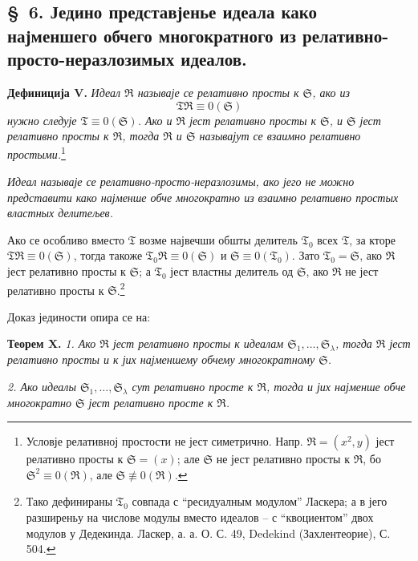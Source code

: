﻿\documentclass[11pt]{article}
\newcommand{\ideal}[1]{\mathfrak{#1}}
\begin{document}

\setcounter{footnote}{22}
\subsection*{\S~6. Једино представјенье идеала како најменшего обчего многократного из релативно-просто-неразлозимых идеалов.}

\textbf{Дефиниција V.} \emph{Идеал \(\ideal R\) называје се релативно просты к \(\ideal S\), ако из
\[
 \ideal T\ideal R\equiv0(\ideal S)
\]
нужно следује \(\ideal T\equiv0(\ideal S)\). Ако и \(\ideal R\) јест релативно просты к \(\ideal S\), и \(\ideal S\) јест релативно просты к \(\ideal R\), тогда \(\ideal R\) и \(\ideal S\) называјут се взаимно релативно простыми.}\footnote{Условје релативној простости не јест симетрично. Напр. \(\ideal R=(x^2,y)\) јест релативно просты к \(\ideal S=(x)\); але \(\ideal S\) не јест релативно просты к \(\ideal R\), бо \(\ideal S^2\equiv0(\ideal R)\), але \(\ideal S\not\equiv0(\ideal R)\).}

\emph{Идеал называје се релативно-просто-неразлозимы, ако јего не можно представити како најменше обче многократно из взаимно релативно простых властных делитељев.}

Ако се особливо вместо \(\ideal T\) возме највечши обшты делитель \(\ideal T_0\) всех \(\ideal T\), за кторе \(\ideal T\ideal R\equiv0(\ideal S)\), тогда такоже \(\ideal T_0\ideal R\equiv0(\ideal S)\) и \(\ideal S\equiv0(\ideal T_0)\). Зато \(\ideal T_0=\ideal S\), ако \(\ideal R\) јест релативно просты к \(\ideal S\); а \(\ideal T_0\) јест властны делитель од \(\ideal S\), ако \(\ideal R\) не јест релативно просты к \(\ideal S\).\footnote{Тако дефинираны \(\ideal T_0\) совпада с ``ресидуалным модулом'' Ласкера; а в јего разширеньу на числове модулы вместо идеалов -- с ``квоциентом'' двох модулов у Дедекинда. Ласкер, а. а. О. С. 49, Dedekind (Захлентеорие), С. 504.}

Доказ јединости опира се на:

\textbf{Теорем X.} \emph{1. Ако \(\ideal R\) јест релативно просты к идеалам \(\ideal S_1,\ldots,\ideal S_\lambda\), тогда \(\ideal R\) јест релативно просты и к јих најменшему обчему многократному \(\ideal S\).}

\emph{2. Ако идеалы \(\ideal S_1,\ldots,\ideal S_\lambda\) сут релативно просте к \(\ideal R\), тогда и јих најменше обче многократно \(\ideal S\) јест релативно просте к \(\ideal R\).}
\end{document}
